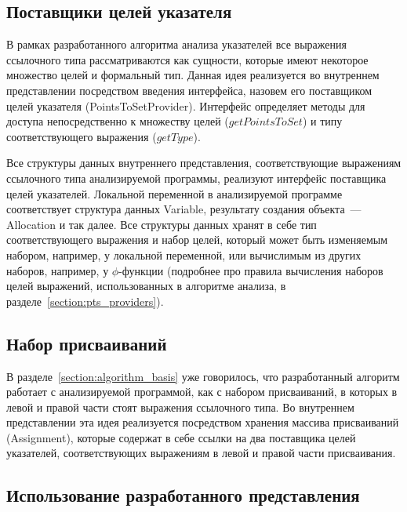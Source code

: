 \documentclass[14pt,titlepage]{extarticle}
\let\oldphi\phi
\renewcommand{\phi}{\ensuremath{\oldphi}}
\newcommand{\eng}[1]{{\English#1}}
\begin{document}
    \subsection{Поставщики целей указателя}

      В рамках разработанного алгоритма анализа указателей все выражения
      ссылочного типа рассматриваются как сущности, которые имеют некоторое
      множество целей и формальный тип.
      Данная идея реализуется во внутреннем представлении посредством введения
      интерфейса, назовем его поставщиком целей указателя
      (\eng{PointsToSetProvider}).
      Интерфейс определяет методы для доступа непосредственно к множеству целей
      ($getPointsToSet$) и типу соответствующего выражения ($getType$).

      Все структуры данных внутреннего представления, соответствующие выражениям
      ссылочного типа анализируемой программы, реализуют интерфейс поставщика
      целей указателей.
      Локальной переменной в анализируемой программе соответствует структура
      данных \eng{Variable}, результату создания объекта~--- \eng{Allocation} и
      так далее.
      Все структуры данных хранят в себе тип соответствующего выражения и набор
      целей, который может быть изменяемым набором, например, у локальной
      переменной, или вычислимым из других наборов, например, у \phi-функции
      (подробнее про правила вычисления наборов целей выражений, использованных
      в алгоритме анализа, в разделе~\ref{section:pts_providers}).

    \subsection{Набор присваиваний}

      В разделе~\ref{section:algorithm_basis} уже говорилось, что разработанный
      алгоритм работает с анализируемой программой, как с набором присваиваний,
      в которых в левой и правой части стоят выражения ссылочного типа. Во
      внутреннем представлении эта идея реализуется посредством хранения
      массива присваиваний (\eng{Assignment}), которые содержат в себе ссылки
      на два поставщика целей указателей, соответствующих выражениям в левой и
      правой части присваивания.

    \subsection{Использование разработанного представления}
\end{document}
